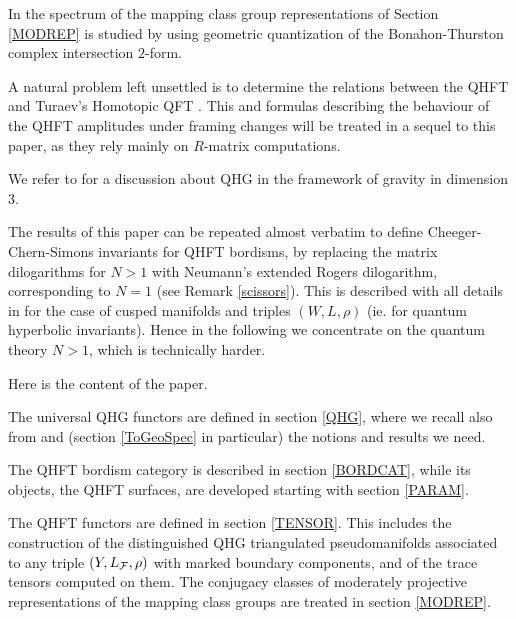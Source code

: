  In \cite{B} the spectrum of the mapping class group representations
 of Section \ref{MODREP} is studied by using geometric quantization of
 the Bonahon-Thurston complex intersection $2$-form. 

A natural problem left unsettled is to determine the relations between
the QHFT and Turaev's Homotopic QFT \cite{Tu2}. This and formulas
describing the behaviour of the QHFT amplitudes under framing changes
will be treated in a sequel to this paper, as they rely mainly on
$R$-matrix computations.

We refer to \cite{BBo} for a discussion about QHG in the framework of
gravity in dimension $3$.

\begin{remark}\label{OKCCS}
{\rm The results of this paper can be repeated almost verbatim to
define Cheeger-Chern-Simons invariants for QHFT bordisms, by replacing
the matrix dilogarithms for $N>1$ with Neumann's extended Rogers
dilogarithm, corresponding to $N=1$ (see Remark \ref{scissors}). This
is described with all details in \cite{BB2} for the case of cusped
manifolds and triples $(W,L,\rho)$ (ie. for quantum hyperbolic
invariants). Hence in the following we concentrate on the quantum
theory $N>1$, which is technically harder.}
\end{remark}

Here is the content of the paper.
\smallskip

The universal QHG functors are defined in section \ref{QHG}, where
we recall also from \cite{BB1,BB2} and \cite{N0,N} (section
\ref{ToGeoSpec} in particular) the notions and results we need. 
\smallskip

The QHFT bordism category is described in section \ref{BORDCAT}, while
its objects, the QHFT surfaces, are developed starting with
section \ref{PARAM}.
\smallskip

The QHFT functors are defined in section \ref{TENSOR}. This includes
the construction of the distinguished QHG triangulated pseudomanifolds
associated to any triple $(Y,L_{\mathcal F},\rho)$ with marked boundary
components, and of the trace tensors computed on them.
The conjugacy classes of moderately projective
representations of the mapping class groups are treated in section
\ref{MODREP}.
\smallskip

